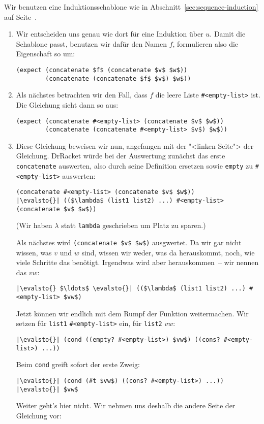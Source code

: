 Wir benutzen eine Induktionsschablone wie in
Abschnitt~\ref{sec:sequence-induction} auf
Seite~\pageref{sec:sequence-induction}.
%
\begin{enumerate}
\item Wir entscheiden uns genau wie dort für eine Induktion über $u$.
  Damit die Schablone passt, benutzen wir dafür den Namen $f$,
  formulieren also die Eigenschaft so um:
%
\begin{lstlisting}
(expect (concatenate $f$ (concatenate $v$ $w$))
        (concatenate (concatenate $f$ $v$) $w$))
\end{lstlisting}
%
\item Als nächstes betrachten wir den Fall, dass $f$ die leere Liste
  \lstinline{#<empty-list>} ist.  Die Gleichung sieht dann so aus:
\begin{lstlisting}
(expect (concatenate #<empty-list> (concatenate $v$ $w$))
        (concatenate (concatenate #<empty-list> $v$) $w$))
\end{lstlisting}
\item Diese Gleichung beweisen wir nun, angefangen mit der "<linken
  Seite"> der Gleichung.  DrRacket würde bei der Auswertung zunächst
  das erste \lstinline{concatenate} auswerten, also durch seine
  Definition ersetzen sowie \lstinline{empty} zu
  \lstinline{#<empty-list>} auswerten:
\begin{lstlisting}
(concatenate #<empty-list> (concatenate $v$ $w$))
|\evalsto{}| (($\lambda$ (list1 list2) ...) #<empty-list> (concatenate $v$ $w$))
\end{lstlisting}
%
(Wir haben $\lambda$ statt \lstinline{lambda} geschrieben um Platz zu
sparen.)

Als nächstes wird \lstinline{(concatenate $v$ $w$)} ausgwertet. Da wir
gar nicht wissen, was $v$ und $w$ sind, wissen wir weder, was da
herauskommt, noch, wie viele Schritte das benötigt.  Irgendwas wird
aber herauskommen~-- wir nennen das $vw$:
%
\begin{lstlisting}
|\evalsto{} $\ldots$ \evalsto{}| (($\lambda$ (list1 list2) ...) #<empty-list> $vw$)
\end{lstlisting}
%
Jetzt können wir endlich mit dem Rumpf der Funktion weitermachen.  Wir
setzen für \lstinline{list1} \lstinline{#<empty-list>} ein, für
\lstinline{list2} $vw$:
%
\begin{lstlisting}
|\evalsto{}| (cond ((empty? #<empty-list>) $vw$) ((cons? #<empty-list>) ...))
\end{lstlisting}
Beim \lstinline{cond} greift sofort der erste Zweig:
\begin{lstlisting}
|\evalsto{}| (cond (#t $vw$) ((cons? #<empty-list>) ...))
|\evalsto{}| $vw$
\end{lstlisting}
%
Weiter geht's hier nicht.  Wir nehmen uns deshalb die andere Seite der
Gleichung vor:


\end{enumerate}
